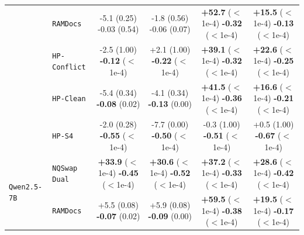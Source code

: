 \documentclass[11pt]{article}
\begin{document}
\begin{table}[t]
{{\begin{tabular}{llcccc}
& \texttt{RAMDocs} & \shortstack{-5.1 (0.25)\\[1pt]-0.03 (0.54)} & \shortstack{-1.8 (0.56)\\[1pt]-0.06 (0.07)} & \shortstack{\textbf{+52.7} ($<$1e-4)\\[1pt]\textbf{-0.32} ($<$1e-4)} & \shortstack{\textbf{+15.5} ($<$1e-4)\\[1pt]\textbf{-0.13} ($<$1e-4)} \\[3.5pt]
& \texttt{HP-Conflict} & \shortstack{-2.5 (1.00)\\[1pt]\textbf{-0.12} ($<$1e-4)} & \shortstack{+2.1 (1.00)\\[1pt]\textbf{-0.22} ($<$1e-4)} & \shortstack{\textbf{+39.1} ($<$1e-4)\\[1pt]\textbf{-0.32} ($<$1e-4)} & \shortstack{\textbf{+22.6} ($<$1e-4)\\[1pt]\textbf{-0.25} ($<$1e-4)} \\[3.5pt]
& \texttt{HP-Clean} & \shortstack{-5.4 (0.34)\\[1pt]\textbf{-0.08} (0.02)} & \shortstack{-4.1 (0.34)\\[1pt]\textbf{-0.13} (0.00)} & \shortstack{\textbf{+41.5} ($<$1e-4)\\[1pt]\textbf{-0.36} ($<$1e-4)} & \shortstack{\textbf{+16.6} ($<$1e-4)\\[1pt]\textbf{-0.21} ($<$1e-4)} \\[3.5pt]
& \texttt{HP-S4} & \shortstack{-2.0 (0.28)\\[1pt]\textbf{-0.55} ($<$1e-4)} & \shortstack{-7.7 (0.00)\\[1pt]\textbf{-0.50} ($<$1e-4)} & \shortstack{-0.3 (1.00)\\[1pt]\textbf{-0.51} ($<$1e-4)} & \shortstack{+0.5 (1.00)\\[1pt]\textbf{-0.67} ($<$1e-4)} \\[3.5pt]
\midrule
\multirow{5}{*}{\texttt{Qwen2.5-7B}}
& \texttt{NQSwap Dual} & \shortstack{\textbf{+33.9} ($<$1e-4)\\[1pt]\textbf{-0.45} ($<$1e-4)} & \shortstack{\textbf{+30.6} ($<$1e-4)\\[1pt]\textbf{-0.52} ($<$1e-4)} & \shortstack{\textbf{+37.2} ($<$1e-4)\\[1pt]\textbf{-0.33} ($<$1e-4)} & \shortstack{\textbf{+28.6} ($<$1e-4)\\[1pt]\textbf{-0.42} ($<$1e-4)} \\[3.5pt]
& \texttt{RAMDocs} & \shortstack{+5.5 (0.08)\\[1pt]\textbf{-0.07} (0.02)} & \shortstack{+5.9 (0.08)\\[1pt]\textbf{-0.09} (0.00)} & \shortstack{\textbf{+59.5} ($<$1e-4)\\[1pt]\textbf{-0.38} ($<$1e-4)} & \shortstack{\textbf{+19.5} ($<$1e-4)\\[1pt]\textbf{-0.17} ($<$1e-4)} \\[3.5pt]

\end{tabular}}}
\end{table}
\end{document}
